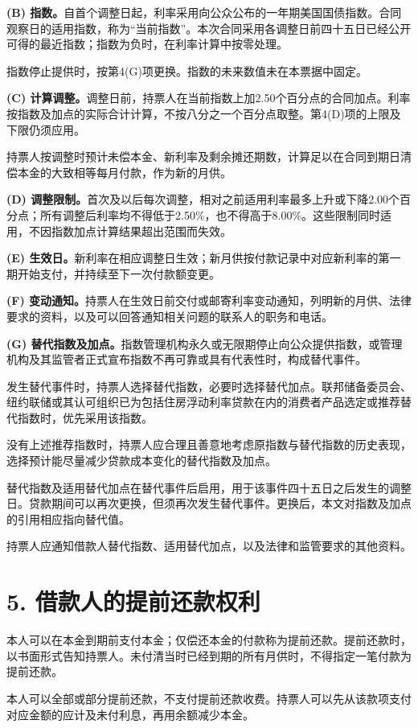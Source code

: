 \documentclass[UTF8,fontset=none,11pt,a4paper]{ctexart}
\begin{document}
\textbf{(B) 指数。}自首个调整日起，利率采用向公众公布的一年期美国国债指数。合同观察日的适用指数，称为“当前指数”。本次合同采用各调整日前四十五日已经公开可得的最近指数；指数为负时，在利率计算中按零处理。


指数停止提供时，按第4(G)项更换。指数的未来数值未在本票据中固定。


\textbf{(C) 计算调整。}调整日前，持票人在当前指数上加2.50个百分点的合同加点。利率按指数及加点的实际合计计算，不按八分之一个百分点取整。第4(D)项的上限及下限仍须应用。


持票人按调整时预计未偿本金、新利率及剩余摊还期数，计算足以在合同到期日清偿本金的大致相等每月付款，作为新的月供。


\textbf{(D) 调整限制。}首次及以后每次调整，相对之前适用利率最多上升或下降2.00个百分点；所有调整后利率均不得低于2.50\%，也不得高于8.00\%。这些限制同时适用，不因指数加点计算结果超出范围而失效。


\textbf{(E) 生效日。}新利率在相应调整日生效；新月供按付款记录中对应新利率的第一期开始支付，并持续至下一次付款额变更。


\textbf{(F) 变动通知。}持票人在生效日前交付或邮寄利率变动通知，列明新的月供、法律要求的资料，以及可以回答通知相关问题的联系人的职务和电话。


\textbf{(G) 替代指数及加点。}指数管理机构永久或无限期停止向公众提供指数，或管理机构及其监管者正式宣布指数不再可靠或具有代表性时，构成替代事件。


发生替代事件时，持票人选择替代指数，必要时选择替代加点。联邦储备委员会、纽约联储或其认可组织已为包括住房浮动利率贷款在内的消费者产品选定或推荐替代指数时，优先采用该指数。


没有上述推荐指数时，持票人应合理且善意地考虑原指数与替代指数的历史表现，选择预计能尽量减少贷款成本变化的替代指数及加点。


替代指数及适用替代加点在替代事件后启用，用于该事件四十五日之后发生的调整日。贷款期间可以再次更换，但须再次发生替代事件。更换后，本文对指数及加点的引用相应指向替代值。


持票人应通知借款人替代指数、适用替代加点，以及法律和监管要求的其他资料。


\section*{5. 借款人的提前还款权利}
本人可以在本金到期前支付本金；仅偿还本金的付款称为提前还款。提前还款时，以书面形式告知持票人。未付清当时已经到期的所有月供时，不得指定一笔付款为提前还款。


本人可以全部或部分提前还款，不支付提前还款收费。持票人可以先从该款项支付对应金额的应计及未付利息，再用余额减少本金。
\end{document}
